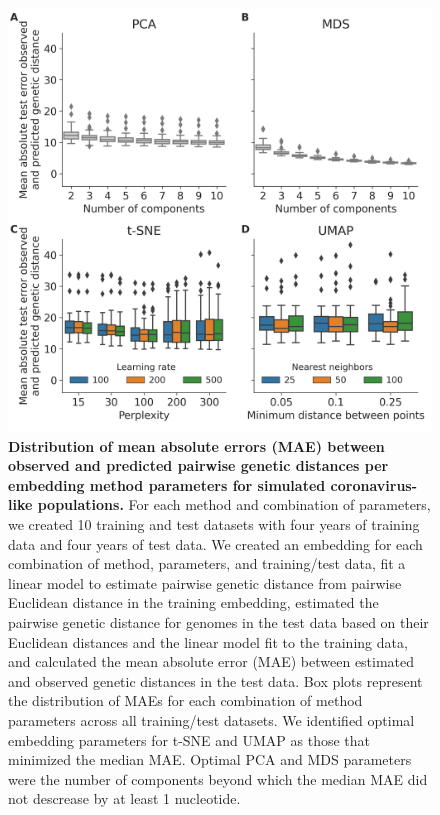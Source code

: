 \begin{figure}[!h]
\includegraphics[width=\columnwidth]{figures/simulated-coronavirus-like-with-moderate-recombination-rate-scores-by-parameters.png}
\caption{{\bf Distribution of mean absolute errors (MAE) between observed and predicted pairwise genetic distances per embedding method parameters for simulated coronavirus-like populations.}
  For each method and combination of parameters, we created 10 training and test datasets with four years of training data and four years of test data.
  We created an embedding for each combination of method, parameters, and training/test data, fit a linear model to estimate pairwise genetic distance from pairwise Euclidean distance in the training embedding, estimated the pairwise genetic distance for genomes in the test data based on their Euclidean distances and the linear model fit to the training data, and calculated the mean absolute error (MAE) between estimated and observed genetic distances in the test data.
  Box plots represent the distribution of MAEs for each combination of method parameters across all training/test datasets.
  We identified optimal embedding parameters for t-SNE and UMAP as those that minimized the median MAE.
  Optimal PCA and MDS parameters were the number of components beyond which the median MAE did not descrease by at least 1 nucleotide.
}\label{S_Fig_simulated_coronavirus_errors}
\end{figure}

